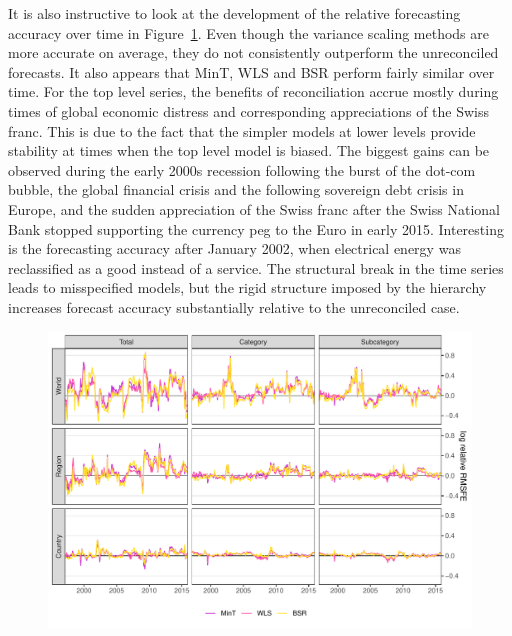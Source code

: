 \documentclass[a4paper,fleqn,11pt]{article}
\begin{document}
It is also instructive to look at the development of the relative forecasting accuracy over time in Figure~\ref{fig:rmse_time}. Even though the variance scaling methods are more accurate on average, they do not consistently outperform the unreconciled forecasts. It also appears that MinT, WLS and BSR perform fairly similar over time. For the top level series, the benefits of reconciliation accrue mostly during times of global economic distress and corresponding appreciations of the Swiss franc. This is due to the fact that the simpler models at lower levels provide stability at times when the top level model is biased. The biggest gains can be observed during the early 2000s recession following the burst of the dot-com bubble, the global financial crisis and the following sovereign debt crisis in Europe, and the sudden appreciation of the Swiss franc after the Swiss National Bank stopped supporting the currency peg to the Euro in early 2015. Interesting is the forecasting accuracy after January 2002, when electrical energy was reclassified as a good instead of a service. The structural break in the time series leads to misspecified models, but the rigid structure imposed by the hierarchy increases forecast accuracy substantially relative to the unreconciled case.

\begin{figure}[H]
	\includegraphics[width=\textwidth]{fig/fig_eval_rmse_time}
	\label{fig:rmse_time}
\end{figure}
\end{document}
